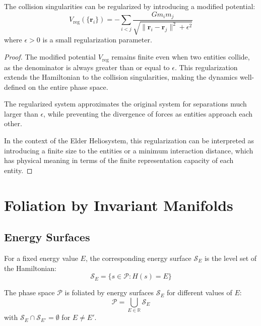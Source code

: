 \begin{theorem}
The collision singularities can be regularized by introducing a modified potential:
\begin{equation}
V_{\text{reg}}(\{\mathbf{r}_i\}) = -\sum_{i < j} \frac{G m_i m_j}{\sqrt{\|\mathbf{r}_i - \mathbf{r}_j\|^2 + \epsilon^2}}
\end{equation}
where $\epsilon > 0$ is a small regularization parameter.
\end{theorem}

\begin{proof}
The modified potential $V_{\text{reg}}$ remains finite even when two entities collide, as the denominator is always greater than or equal to $\epsilon$. This regularization extends the Hamiltonian to the collision singularities, making the dynamics well-defined on the entire phase space.

The regularized system approximates the original system for separations much larger than $\epsilon$, while preventing the divergence of forces as entities approach each other.

In the context of the Elder Heliosystem, this regularization can be interpreted as introducing a finite size to the entities or a minimum interaction distance, which has physical meaning in terms of the finite representation capacity of each entity.
\end{proof}

\section{Foliation by Invariant Manifolds}

\subsection{Energy Surfaces}

\begin{definition}
For a fixed energy value $E$, the corresponding energy surface $\mathcal{S}_E$ is the level set of the Hamiltonian:
\begin{equation}
\mathcal{S}_E = \{s \in \mathcal{P} : H(s) = E\}
\end{equation}
\end{definition}

\begin{theorem}
The phase space $\mathcal{P}$ is foliated by energy surfaces $\mathcal{S}_E$ for different values of $E$:
\begin{equation}
\mathcal{P} = \bigcup_{E \in \mathbb{R}} \mathcal{S}_E
\end{equation}
with $\mathcal{S}_E \cap \mathcal{S}_{E'} = \emptyset$ for $E \neq E'$.
\end{theorem}

